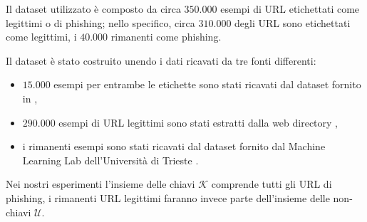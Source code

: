 \documentclass[../../main.tex]{subfiles}
\begin{document}
    Il dataset utilizzato è composto da circa $350.000$ esempi di URL etichettati come legittimi o di phishing; nello specifico, circa $310.000$ degli URL sono etichettati come legittimi, i $40.000$ rimanenti come phishing.

    Il dataset è stato costruito unendo i dati ricavati da tre fonti differenti: 
    \begin{itemize}
        \item $15.000$ esempi per entrambe le etichette sono stati ricavati dal dataset fornito in \cite{article},
        \item $290.000$ esempi di URL legittimi sono stati estratti dalla web directory \cite{botw},
        \item i rimanenti esempi sono stati ricavati dal dataset fornito dal Machine Learning Lab dell'Università di Trieste \cite{machinelearninglab}.
    \end{itemize}

    Nei nostri esperimenti l'insieme delle chiavi $\mathcal{K}$ comprende tutti gli URL di phishing, i rimanenti URL legittimi faranno invece parte dell'insieme delle non-chiavi $\mathcal{U}$.
\end{document}
